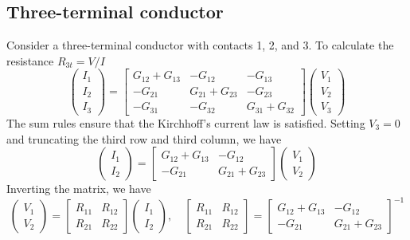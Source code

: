 \documentclass[11pt,a4paper]{book}
\theoremstyle{plain}
\theoremstyle{definition}
\theoremstyle{remark}
\begin{document}
\subsection{Three-terminal conductor}
Consider a three-terminal conductor with contacts 1, 2, and 3. To calculate the resistance $R_{3t} = V/I$
\begin{equation}
    \begin{pmatrix}
        I_1 \\
        I_2 \\
        I_3
    \end{pmatrix}
    =
    \begin{bmatrix}
        G_{12} + G_{13} & -G_{12} & -G_{13} \\
        -G_{21} & G_{21} + G_{23} & -G_{23} \\
        -G_{31} & -G_{32} & G_{31} + G_{32}
    \end{bmatrix}
    \begin{pmatrix}
        V_1 \\
        V_2 \\
        V_3
    \end{pmatrix}
\end{equation}
The sum rules ensure that the Kirchhoff's current law is satisfied. Setting $V_3 = 0$ and truncating the third row and third column, we have
\begin{equation}
    \begin{pmatrix}
        I_1 \\
        I_2
    \end{pmatrix}
    =
    \begin{bmatrix}
        G_{12} + G_{13} & -G_{12} \\
        -G_{21} & G_{21} + G_{23}
    \end{bmatrix}
    \begin{pmatrix}
        V_1 \\
        V_2
    \end{pmatrix}
\end{equation}
Inverting the matrix, we have
\begin{equation}
    \begin{pmatrix}
        V_1 \\
        V_2
    \end{pmatrix}
    =
    \begin{bmatrix}
        R_{11} & R_{12} \\
        R_{21} & R_{22}
    \end{bmatrix}
    \begin{pmatrix}
        I_1 \\
        I_2
    \end{pmatrix}
    , \quad
    \begin{bmatrix}
        R_{11} & R_{12} \\
        R_{21} & R_{22}
    \end{bmatrix}
    =
    \begin{bmatrix}
        G_{12} + G_{13} & -G_{12} \\
        -G_{21} & G_{21} + G_{23}
    \end{bmatrix}^{-1}
\end{equation}
\end{document}
